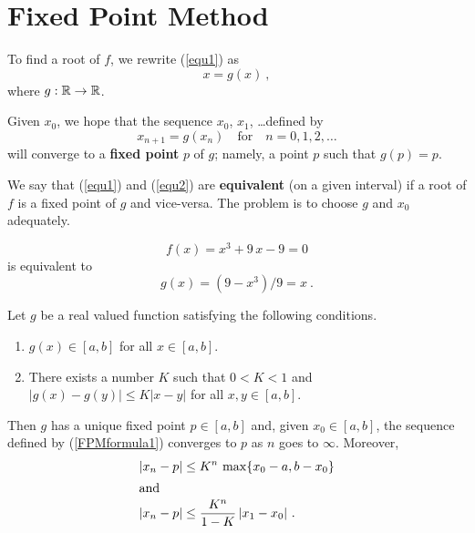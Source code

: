 \section{Fixed Point Method}

To find a root of $f$, we rewrite (\ref{equ1}) as
\begin{equation} \label{equ2}
x  =  g(x) \ ,
\end{equation}
where $g:\mathbb{R} \rightarrow \mathbb{R}$.

Given $x_0$, we hope that the sequence $x_0$, $x_1$, \dots defined by
\begin{equation} \label{FPMformula1}
x_{n+1} = g(x_n) \quad \text{for} \quad n=0,1,2,\dots
\end{equation}
will converge to a
{\bfseries fixed point} $p$ of $g$;
namely, a point $p$ such that $g(p) = p$.

We say that (\ref{equ1}) and (\ref{equ2}) are
{\bfseries equivalent}
(on a given interval) if a root of $f$ is a fixed point of $g$ and
vice-versa.  The problem is to choose $g$ and $x_0$ adequately.

\begin{egg}\label{fixit}
\[
f(x) = x^3+9\,x-9 = 0
\]
is equivalent to
\[
g(x) = (9-x^3)/9 = x \ .
\]
\end{egg}

\begin{theorem}
Let $g$ be a real valued function satisfying the following conditions.
\begin{enumerate}
\item $g(x)\in [a,b]$ for all $x\in[a,b]$.
\item There exists a number $K$ such that $0<K<1$
and $|g(x)-g(y)| \leq K |x-y|$ for all $x,y\in [a,b]$.
\end{enumerate}
Then $g$ has a unique fixed point $p \in [a,b]$ and, given
$x_0 \in [a,b]$, the sequence defined by (\ref{FPMformula1}) converges to
$p$ as $n$ goes to $\infty$.  Moreover,
\begin{align}
|x_n - p | & \leq K^n \, \max\{x_0 - a,b- x_0\} \label{ineq1} \\
\intertext{and}
|x_n - p | & \leq \frac{K^n}{1-K} \, |x_1 - x_0 | \ . \label{ineq2}
\end{align}
\label{FxPtTh}
\end{theorem}

